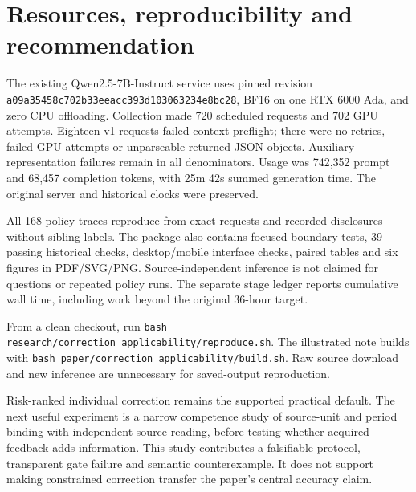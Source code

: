 \documentclass[10pt]{article}
\begin{document}
\section{Resources, reproducibility and recommendation}
The existing Qwen2.5-7B-Instruct service uses pinned revision \texttt{a09a35458c702b33eeacc393d103063234e8bc28}, BF16 on one RTX 6000 Ada, and zero CPU offloading. Collection made 720 scheduled requests and 702 GPU attempts. Eighteen v1 requests failed context preflight; there were no retries, failed GPU attempts or unparseable returned JSON objects. Auxiliary representation failures remain in all denominators. Usage was 742,352 prompt and 68,457 completion tokens, with 25m 42s summed generation time. The original server and historical clocks were preserved.

All 168 policy traces reproduce from exact requests and recorded disclosures without sibling labels. The package also contains focused boundary tests, 39 passing historical checks, desktop/mobile interface checks, paired tables and six figures in PDF/SVG/PNG. Source-independent inference is not claimed for questions or repeated policy runs. The separate stage ledger reports cumulative wall time, including work beyond the original 36-hour target.

From a clean checkout, run \texttt{bash research/correction\_applicability/reproduce.sh}. The illustrated note builds with \texttt{bash paper/correction\_applicability/build.sh}. Raw source download and new inference are unnecessary for saved-output reproduction.

Risk-ranked individual correction remains the supported practical default. The next useful experiment is a narrow competence study of source-unit and period binding with independent source reading, before testing whether acquired feedback adds information. This study contributes a falsifiable protocol, transparent gate failure and semantic counterexample. It does not support making constrained correction transfer the paper's central accuracy claim.


\end{document}
